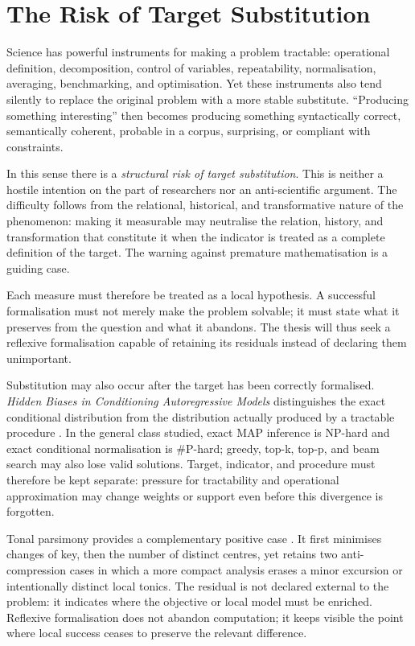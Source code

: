\documentclass[11pt,a4paper]{article}
\begin{document}
\section{The Risk of Target Substitution}

Science has powerful instruments for making a problem tractable: operational
definition, decomposition, control of variables, repeatability, normalisation,
averaging, benchmarking, and optimisation. Yet these instruments also tend
silently to replace the original problem with a more stable substitute.
``Producing something interesting'' then becomes producing something
syntactically correct, semantically coherent, probable in a corpus, surprising,
or compliant with constraints.

In this sense there is a \emph{structural risk of target substitution}. This is
neither a hostile intention on the part of researchers nor an anti-scientific
argument. The difficulty follows from the relational, historical, and
transformative nature of the phenomenon: making it measurable may neutralise
the relation, history, and transformation that constitute it when the indicator
is treated as a complete definition of the target. The warning against premature
mathematisation
\parencite{russell1995rationality,russell1995awardlecture} is a guiding case.

Each measure must therefore be treated as a local hypothesis. A successful
formalisation must not merely make the problem solvable; it must state what it
preserves from the question and what it abandons. The thesis will thus seek a
reflexive formalisation capable of retaining its residuals instead of declaring
them unimportant.

Substitution may also occur after the target has been correctly formalised.
\emph{Hidden Biases in Conditioning Autoregressive Models} distinguishes the
exact conditional distribution from the distribution actually produced by a
tractable procedure \parencite{pachet2026biases}. In the general class studied,
exact MAP inference is NP-hard and exact conditional normalisation is
\#P-hard; greedy, top-k, top-p, and beam search may also lose valid solutions.
Target, indicator, and procedure must therefore be kept separate: pressure for
tractability and operational approximation may change weights or support even
before this divergence is forgotten.

Tonal parsimony provides a complementary positive case
\parencite{pachet2026tonalparsimony}. It first minimises changes of key, then the
number of distinct centres, yet retains two anti-compression cases in which a
more compact analysis erases a minor excursion or intentionally distinct local
tonics. The residual is not declared external to the problem: it indicates
where the objective or local model must be enriched. Reflexive formalisation
does not abandon computation; it keeps visible the point where local success
ceases to preserve the relevant difference.
\end{document}
